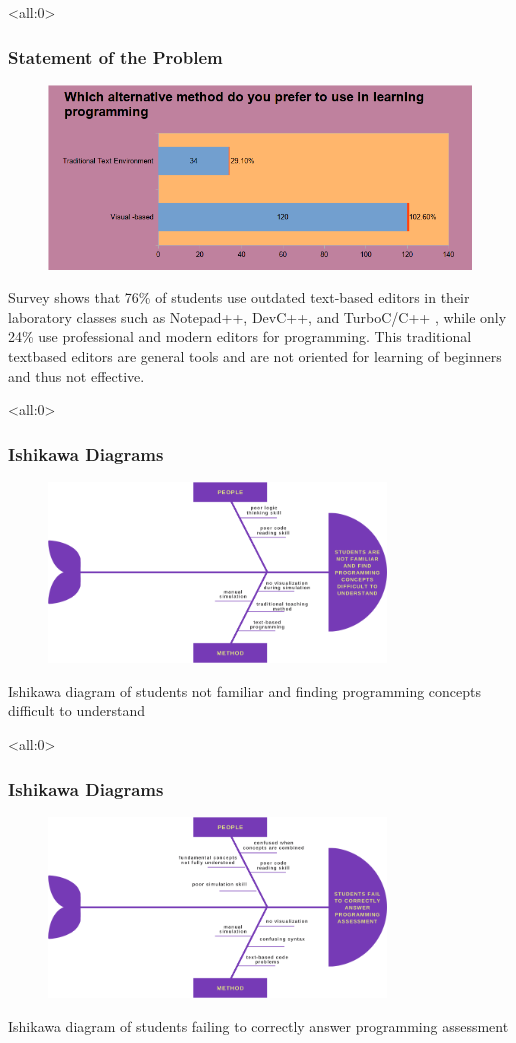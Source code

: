 \documentclass[handout]{beamer}
\newcommand{\parx}{
	\setlength{\parindent}{4em}
	\par}
\begin{document}
\begin{frame}<all:0>
	\frametitle{Statement of the Problem}
	\begin{figure}
		\includegraphics[scale=0.25]{results/10.png}
	\end{figure}

	\justifying
	\parx
	Survey shows that 76\% of students use outdated text-based editors in their
	laboratory classes such as Notepad++, DevC++, and TurboC/C++ , while only
	24\% use professional and modern editors for programming. This traditional
	textbased editors are general tools and are not oriented for learning of
	beginners and thus not effective.
\end{frame}

\begin{frame}<all:0>
	\frametitle{Ishikawa Diagrams}
	\begin{figure}
		\includegraphics[width=0.8\textwidth]{figures/fishbone1.png}
	\end{figure}
	\centering
	Ishikawa diagram of students not familiar and finding programming concepts
	difficult to understand
\end{frame}

\begin{frame}<all:0>
	\frametitle{Ishikawa Diagrams}
	\begin{figure}
		\includegraphics[width=0.8\textwidth]{figures/fishbone2.png}
	\end{figure}
	\centering
	Ishikawa diagram of students failing to correctly answer programming
	assessment
\end{frame}
\end{document}
